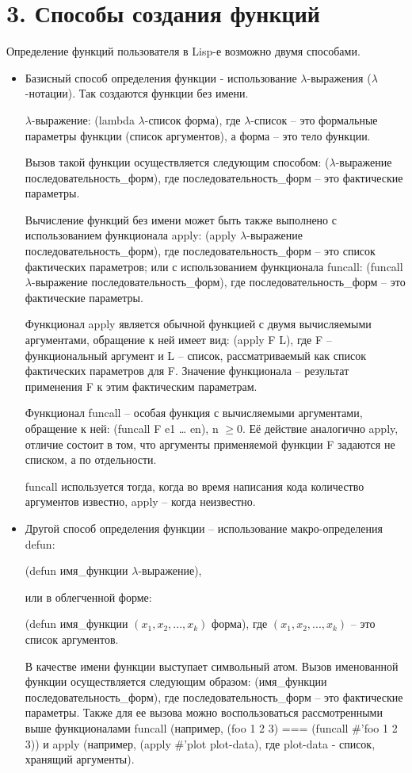 \documentclass[12pt]{report}
\begin{document}
	
	
	\section*{3. Способы создания функций}
	
	Определение функций пользователя в Lisp-е возможно двумя способами.
	
	
	\begin{itemize}
		\item Базисный способ  определения  функции - использование $\lambda$-выражения ($\lambda$-нотации). Так создаются функции без имени.
		
		$\lambda$-выражение: (lambda $\lambda$-список форма), 
		где $\lambda$-список --  это формальные параметры функции (список аргументов), а форма -- это тело функции.
		
		Вызов такой функции осуществляется следующим способом: ($\lambda$-выражение последовательность\_форм), 
		где последовательность\_форм -- это фактические параметры.
		
		Вычисление функций без имени может быть также выполнено с использованием функционала apply: (apply $\lambda$-выражение последовательность\_форм), где последовательность\_форм -- это список фактических параметров; или с использованием функционала funcall: (funcall $\lambda$-выражение последовательность\_форм), где последовательность\_форм -- это фактические параметры.
		
		Функционал apply является обычной функцией с двумя  вычисляемыми аргументами, обращение к ней имеет вид: (apply F L), где F – функциональный аргумент и L -- список, рассматриваемый как список фактических параметров для F. Значение функционала -- результат применения F к этим фактическим параметрам.
		
		Функционал funcall – особая функция с вычисляемыми аргументами, обращение к ней: (funcall F e1 … en), n $\geqslant 0$. Её   действие аналогично apply, отличие состоит в том, что аргументы  применяемой функции F задаются не списком, а по отдельности. 
		
		funcall используется тогда, когда во время написания кода количество аргументов известно, apply -- когда неизвестно.
		
		\item Другой способ определения функции -- использование макро-определения defun: 
		
		(defun имя\_функции $\lambda$-выражение), 
		
		или  в облегченной форме:
		
		(defun имя\_функции $(x_1, x_2, ..., x_k)$ форма), 
		где $(x_1, x_2, ..., x_k)$ -- это  список аргументов.
		
		В качестве имени функции выступает символьный атом. 
		Вызов именованной функции осуществляется следующим образом: (имя\_функции последовательность\_форм), 
		где последовательность\_форм -- это фактические параметры.
		Также для ее вызова можно воспользоваться рассмотренными выше функционалами funcall (например, (foo 1 2 3) === (funcall \#'foo 1 2 3)) и apply (например, (apply \#'plot plot-data), где plot-data - список, хранящий аргументы).
		
	\end{itemize}
	
\end{document}
